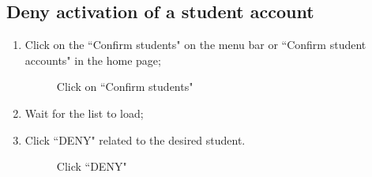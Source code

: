 \documentclass[ManualeUtente]{subfiles}
\begin{document}
\subsection{Deny activation of a student account}
\begin{enumerate}
	\item Click on the \textquotedblleft Confirm students" on the menu bar or \textquotedblleft Confirm student accounts" in the home page;
	\begin{figure}[H]
		\centering
		\caption{Click on ``Confirm students"}
		\label{fig:Click on "Confirm students"}
	\end{figure}
	\item Wait for the list to load;
	\item Click \textquotedblleft DENY" related to the desired student.
	\begin{figure}[H]
		\centering
		\caption{Click ``DENY"}
		\label{fig:Click "DENY"}
	\end{figure}
\end{enumerate}
\end{document}
